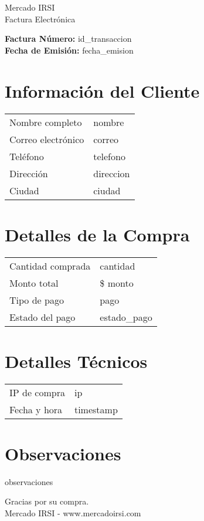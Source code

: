 \documentclass[12pt]{article}
\begin{document}
\begin{center}
    \Huge Mercado IRSI \\
    \Large Factura Electrónica
\end{center}

\vspace{0.5cm}

\noindent \textbf{Factura Número:} {id_transaccion} \\
\textbf{Fecha de Emisión:} {fecha_emision}

\vspace{0.5cm}

\section*{Información del Cliente}
\begin{longtable}{ll}
Nombre completo & {nombre} \\
Correo electrónico & {correo} \\
Teléfono & {telefono} \\
Dirección & {direccion} \\
Ciudad & {ciudad} \\
\end{longtable}

\vspace{0.5cm}

\section*{Detalles de la Compra}
\begin{longtable}{ll}
Cantidad comprada & {cantidad} \\
Monto total & \$ {monto} \\
Tipo de pago & {pago} \\
Estado del pago & {estado_pago} \\
\end{longtable}

\vspace{0.5cm}

\section*{Detalles Técnicos}
\begin{longtable}{ll}
IP de compra & {ip} \\
Fecha y hora & {timestamp} \\
\end{longtable}

\vspace{0.5cm}

\section*{Observaciones}
{observaciones}

\vspace{0.5cm}

\begin{center}
    Gracias por su compra. \\
    Mercado IRSI - www.mercadoirsi.com
\end{center}
\end{document}

